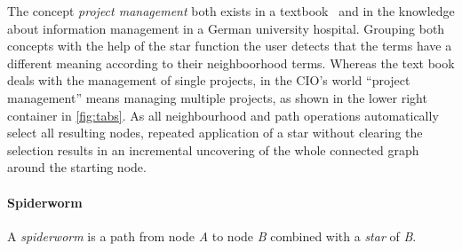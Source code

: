 \documentclass{IOS-Book-Article}     %
\begin{document}
The concept \emph{project management} both exists in a textbook~\cite{ob} and in the knowledge about information management in a German university hospital.
Grouping both concepts with the help of the star function the user detects that the terms have a different meaning according to their neighboorhood terms.
Whereas the text book deals with the management of single projects, in the CIO's world \enquote{project management} means managing multiple projects, as shown in the lower right container in \cref{fig:tabs}.
As all neighbourhood and path operations automatically select all resulting nodes, repeated application of a star without clearing the selection results in an incremental uncovering of the whole connected graph around the starting node.

\paragraph{Spiderworm}
A \emph{spiderworm} is a path from node \emph{A} to node \emph{B} combined with a \emph{star} of \emph{B}.

\end{document}
